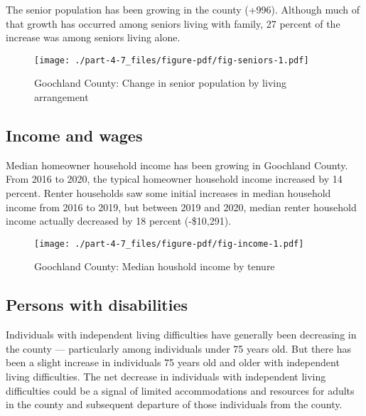 \documentclass[
  letterpaper,
  DIV=11,
  numbers=noendperiod]{scrreprt}
\begin{document}
The senior population has been growing in the county (+996). Although
much of that growth has occurred among seniors living with family, 27
percent of the increase was among seniors living alone.

\begin{figure}

{\centering \texttt{[image: ./part-4-7\_files/figure-pdf/fig-seniors-1.pdf]}

}

\caption{\label{fig-seniors}Goochland County: Change in senior
population by living arrangement}

\end{figure}

\hypertarget{income-and-wages-6}{%
\subsection{Income and wages}\label{income-and-wages-6}}

Median homeowner household income has been growing in Goochland County.
From 2016 to 2020, the typical homeowner household income increased by
14 percent. Renter households saw some initial increases in median
household income from 2016 to 2019, but between 2019 and 2020, median
renter household income actually decreased by 18 percent (-\$10,291).

\begin{figure}

{\centering \texttt{[image: ./part-4-7\_files/figure-pdf/fig-income-1.pdf]}

}

\caption{\label{fig-income}Goochland County: Median houshold income by
tenure}

\end{figure}

\hypertarget{persons-with-disabilities-5}{%
\subsection{Persons with
disabilities}\label{persons-with-disabilities-5}}

Individuals with independent living difficulties have generally been
decreasing in the county --- particularly among individuals under 75
years old. But there has been a slight increase in individuals 75 years
old and older with independent living difficulties. The net decrease in
individuals with independent living difficulties could be a signal of
limited accommodations and resources for adults in the county and
subsequent departure of those individuals from the county.
\end{document}
